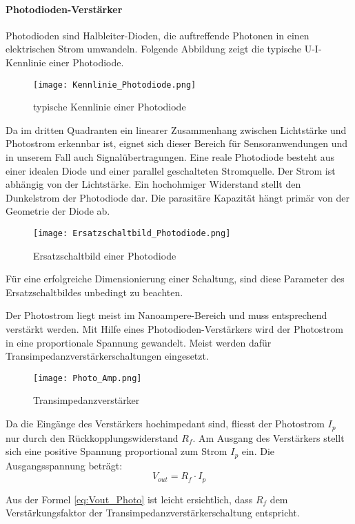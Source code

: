 \paragraph{Photodioden-Verstärker}
Photodioden sind Halbleiter-Dioden, die auftreffende Photonen in einen elektrischen Strom umwandeln. Folgende Abbildung zeigt die typische U-I-Kennlinie einer Photodiode.
\begin{figure}[h]
	\centering
	\texttt{[image: Kennlinie\_Photodiode.png]}
	\caption{typische Kennlinie einer Photodiode}\label{fig:Kenn_Photodiode}
\end{figure}
Da im dritten Quadranten ein linearer Zusammenhang zwischen Lichtstärke und Photostrom erkennbar ist, eignet sich dieser Bereich für Sensoranwendungen und in unserem Fall auch Signalübertragungen.
Eine reale Photodiode besteht aus einer idealen Diode und einer parallel geschalteten Stromquelle. Der Strom ist abhängig von der Lichtstärke. Ein hochohmiger Widerstand stellt den Dunkelstrom der Photodiode dar. Die parasitäre Kapazität hängt primär von der Geometrie der Diode ab.
 \begin{figure}[H]
 	\centering
 	\texttt{[image: Ersatzschaltbild\_Photodiode.png]}
 	\caption{Ersatzschaltbild einer Photodiode}\label{fig:Ersatz_Photodiode}
 \end{figure}
Für eine erfolgreiche Dimensionierung einer Schaltung, sind diese Parameter des Ersatzschaltbildes unbedingt zu beachten.\newline

Der Photostrom liegt meist im Nanoampere-Bereich und muss entsprechend verstärkt werden. Mit Hilfe eines Photodioden-Verstärkers wird der Photostrom in eine proportionale Spannung gewandelt. Meist werden dafür Transimpedanzverstärkerschaltungen eingesetzt.
\begin{figure}[h]
	\centering
	\texttt{[image: Photo\_Amp.png]}
	\caption{Transimpedanzverstärker}\label{fig:Photo_Amp}
\end{figure}

Da die Eingänge des Verstärkers hochimpedant sind, fliesst der Photostrom $ I_{p} $ nur durch den Rückkopplungswiderstand $ R_{f} $. Am Ausgang des Verstärkers stellt sich eine positive Spannung proportional zum Strom $ I_{p} $ ein. Die Ausgangsspannung beträgt:
\begin{equation}\label{eq:Vout_Photo}
V_{out}=R_{f} \cdot I_{p}
\end{equation}

Aus der Formel \ref{eq:Vout_Photo} ist leicht ersichtlich, dass $ R_{f} $ dem Verstärkungsfaktor der Transimpedanzverstärkerschaltung entspricht.


